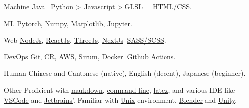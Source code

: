 
\begin{cvskills}
  \cvskill
  {Machine}
  {\href{https://www.java.com/en/}{Java} \approx\, \href{https://www.python.org/}{Python} >\, \href{https://www.javascript.com/}{Javascript} > \href{https://www.khronos.org/opengl/wiki/OpenGL_Shading_Language}{GLSL} = \href{https://developer.mozilla.org/en-US/docs/Glossary/HTML5}{HTML}/\href{https://developer.mozilla.org/en-US/docs/Web/CSS}{CSS}.}
  
  \cvskill
  {ML} %
  {\href{https://pytorch.org/}{Pytorch}, \href{https://numpy.org/}{Numpy}, \href{https://matplotlib.org/}{Matplotlib}, \href{https://jupyter.org/}{Jupyter}.}  %

  \cvskill
  {Web} %
  {\href{https://nodejs.org/en/}{NodeJs}, \href{https://reactjs.org/}{ReactJs}, \href{https://threejs.org/}{ThreeJs}, \href{https://nextjs.org/}{NextJs}, \href{https://sass-lang.com/}{SASS/SCSS}.}
  
  \cvskill
    {DevOps} %
    {\href{https://git-scm.com/}{Git}, \href{https://en.wikipedia.org/wiki/Code_review}{CR}, \href{https://aws.amazon.com/}{AWS}, \href{https://www.scrum.org/resources/what-is-scrum}{Scrum}, \href{https://www.docker.com/}{Docker}, \href{https://github.com/features/actions}{Github Actions}.}
 
  \cvskill
    {Human}
    {Chinese and Cantonese (native), English (decent), Japanese (beginner).}

  \cvskill
    {Other} %
    {Proficient with \href{https://en.wikipedia.org/wiki/Markdown}{markdown}, \href{https://en.wikipedia.org/wiki/Command-line_interface}{command-line}, \href{https://www.latex-project.org/}{latex}, and various IDE like \href{https://code.visualstudio.com/}{VSCode} and \href{https://www.jetbrains.com/}{Jetbrains'}. Familiar with \href{https://en.wikipedia.org/wiki/Unix}{Unix} environment, \href{https://www.blender.org/}{Blender} and \href{https://unity.com/}{Unity}.}

\end{cvskills}
